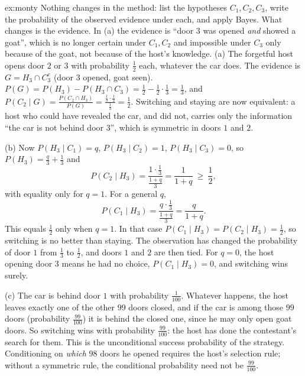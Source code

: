 \begin{solution}{ex:monty}
\idea Nothing changes in the method: list the hypotheses $C_1,C_2,C_3$, write the probability of the observed evidence under each, and apply Bayes. What changes is the evidence. In (a) the evidence is ``door $3$ was opened \emph{and} showed a goat'', which is no longer certain under $C_1,C_2$ and impossible under $C_3$ only because of the goat, not because of the host's knowledge.
\writeup (a) The forgetful host opens door $2$ or $3$ with probability $\frac12$ each, whatever the car does. The evidence is $G=H_3\cap C_3^c$ (door $3$ opened, goat seen). $P(G)=P(H_3)-P(H_3\cap C_3)=\frac12-\frac12\cdot\frac13=\frac13$, and $P(C_2\mid G)=\frac{P(C_2\cap H_3)}{P(G)}=\frac{\frac13\cdot\frac12}{\frac13}=\frac12$. Switching and staying are now equivalent: a host who could have revealed the car, and did not, carries only the information ``the car is not behind door $3$'', which is symmetric in doors $1$ and $2$.

(b) Now $P(H_3\mid C_1)=q$, $P(H_3\mid C_2)=1$, $P(H_3\mid C_3)=0$, so $P(H_3)=\frac q3+\frac13$ and
\[
P(C_2\mid H_3)=\frac{1\cdot\frac13}{\frac{1+q}3}=\frac1{1+q}\ \ge\ \frac12 ,
\]
with equality only for $q=1$. For a general $q$,
\[
P(C_1\mid H_3)=\frac{q\cdot\frac13}{\frac{1+q}3}=\frac q{1+q}.
\]
This equals $\frac12$ only when $q=1$. In that case $P(C_1\mid H_3)=P(C_2\mid H_3)=\frac12$, so switching is no better than staying. The observation has changed the probability of door $1$ from $\frac13$ to $\frac12$, and doors $1$ and $2$ are then tied. For $q=0$, the host opening door $3$ means he had no choice, $P(C_1\mid H_3)=0$, and switching wins surely.

(c) The car is behind door $1$ with probability $\frac1{100}$. Whatever happens, the host leaves exactly one of the other $99$ doors closed, and if the car is among those $99$ doors (probability $\frac{99}{100}$) it is behind the closed one, since he may only open goat doors. So switching wins with probability $\frac{99}{100}$: the host has done the contestant's search for them. This is the unconditional success probability of the strategy. Conditioning on \emph{which} $98$ doors he opened requires the host's selection rule; without a symmetric rule, the conditional probability need not be $\frac{99}{100}$.
\end{solution}

